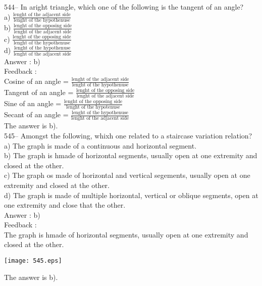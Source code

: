\documentclass[letterpaper, 12pt]{article}
\begin{document}
544-- In aright triangle, which one of the following is the tangent of an angle?\\[2mm]
a) $\frac{\textrm{lenght of the adjacent side}}{\textrm{lenght of the hypothenuse}}$\\[2mm]
b) $\frac{\textrm{lenght of the opposing side}}{\textrm{lenght of the adjacent side}}$\\[2mm]
c) $\frac{\textrm{lenght of the opposing side}}{\textrm{lenght of the hypothenuse}}$\\[2mm]
d) $\frac{\textrm{lenght of the hypothenuse}}{\textrm{lenght of the adjacent side}}$\\

Answer : b)\\

Feedback : \\
Cosine of an angle = $\frac{\textrm{lenght of the adjacent side}}{\textrm{lenght of the hypothenuse}}$\\[2mm]
Tangent of an angle = $\frac{\textrm{lenght of the opposing side}}{\textrm{lenght of the adjacent side}}$\\[2mm]
Sine of an angle = $\frac{\textrm{lenght of the opposing side}}{\textrm{lenght of the hypotenuse}}$\\[2mm]
Secant of an angle =  $\frac{\textrm{lenght of the hypothenuse}}{\textrm{lenght of the adjacent side}}$\\[2mm]
The answer is b).\\

545-- Amongst the following, whixh one related to a staircase variation relation?\\
a) The graph is made of a continuous and horizontal segment. \\
b) The graph is hmade of horizontal segments, usually open at one extremity and closed at the other.\\
c) The graph os made of horizontal and vertical segements, usually open at one extremity and closed at the other.\\
d) The graph is made of multiple horizontal, vertical or oblique segments, open at one extremity and close that the other.\\

Answer : b)\\

Feedback : \\
The graph is hmade of horizontal segments, usually open at one extremity and closed at the other.
   \begin{center}
    \texttt{[image: 545.eps]}
    \end{center}
The answer is b).\\
\end{document}
